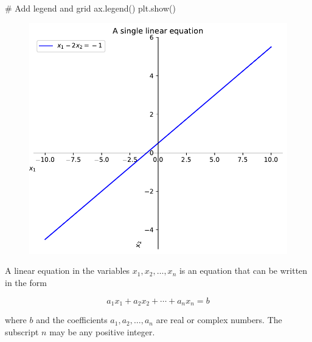 \documentclass[
  letterpaper,
  DIV=11,
  numbers=noendperiod]{scrreprt}
\newenvironment{Shaded}{\begin{snugshade}}{\end{snugshade}}
\newcommand{\CommentTok}[1]{\textcolor[rgb]{0.37,0.37,0.37}{#1}}
\newcommand{\NormalTok}[1]{\textcolor[rgb]{0.00,0.23,0.31}{#1}}
\begin{document}
\begin{Shaded}
\begin{Highlighting}[]
\CommentTok{\# Add legend and grid}
\NormalTok{ax.legend()}
\NormalTok{plt.show()}
\end{Highlighting}
\end{Shaded}

\begin{figure}[H]

{\centering \includegraphics{p1_files/figure-pdf/cell-2-output-1.pdf}

}

\end{figure}

\begin{tcolorbox}[enhanced jigsaw, colbacktitle=quarto-callout-note-color!10!white, colback=white, colframe=quarto-callout-note-color-frame, title=\textcolor{quarto-callout-note-color}{\faInfo}\hspace{0.5em}{Definition of a linear equation}, opacityback=0, coltitle=black, left=2mm, leftrule=.75mm, rightrule=.15mm, opacitybacktitle=0.6, bottomrule=.15mm, titlerule=0mm, bottomtitle=1mm, breakable, toptitle=1mm, arc=.35mm, toprule=.15mm]

A linear equation in the variables \(x_1, x_2, \ldots, x_n\) is an
equation that can be written in the form

\[a_1x_1 + a_2x_2 + \cdots + a_nx_n = b\]

where \(b\) and the coefficients \(a_1, a_2, \ldots, a_n\) are real or
complex numbers. The subscript \(n\) may be any positive integer.

\end{tcolorbox}
\end{document}
